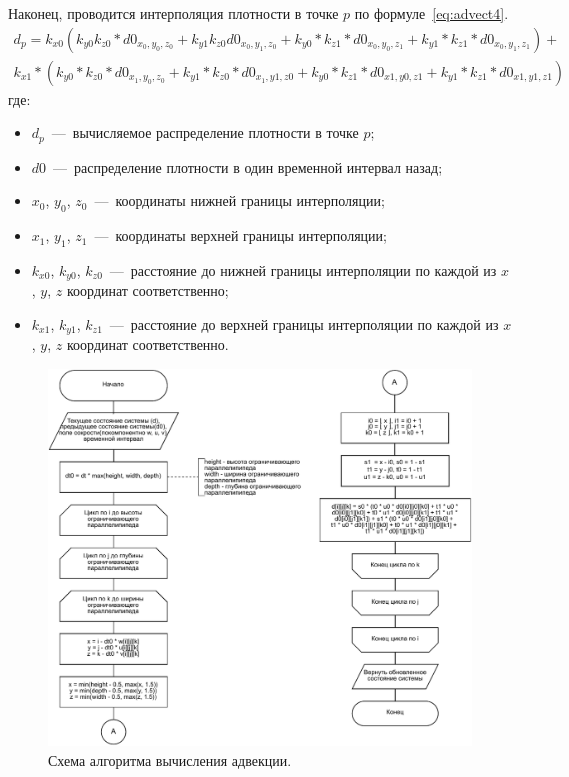 Наконец, проводится интерполяция плотности в точке $p$ по формуле~\ref{eq:advect4}.
\begin{multline}
	\label{eq:advect4}
	d_p = k_{x0} (k_{y0} k_{z0} * d0_{x_0, y_0, z_0} + k_{y1} k_{z0} d0_{x_0, y_1, z_0} + k_{y0} * k_{z1} * d0_{x_0, y_0, z_1} +
	k_{y1} * k_{z1} * d0_{x_0, y_1, z_1}) + \\
	k_{x1} * (k_{y0} * k_{z0} * d0_{x_1, y_0, z_0} + k_{y1} * k_{z0} * d0_{x_1, y1, z0} + k_{y0} * k_{z1} * d0_{x1, y0, z1} + k_{y1} * k_{z1} * d0_{x1, y1, z1})
\end{multline}
где:
\begin{itemize}
	\item $d_p$~---~вычисляемое распределение плотности в точке $p$;
	\item $d0$~---~распределение плотности в один временной интервал назад;
	\item $x_0$, $y_0$, $z_0$~---~координаты нижней границы интерполяции;
	\item $x_1$, $y_1$, $z_1$~---~координаты верхней границы интерполяции;
	\item $k_{x0}$, $k_{y0}$, $k_{z0}$~---~расстояние до нижней границы интерполяции по каждой из $x$, $y$, $z$ координат соответственно;
	\item $k_{x1}$, $k_{y1}$, $k_{z1}$~---~расстояние до верхней границы интерполяции по каждой из $x$, $y$, $z$ координат соответственно.
\end{itemize}

\begin{figure}[H]
	\centering
	\includegraphics[width=1.0\textwidth,page=1]{assets/img/advect.pdf}
	\caption{Схема алгоритма вычисления адвекции.}
	\label{fig:advect}
\end{figure}

